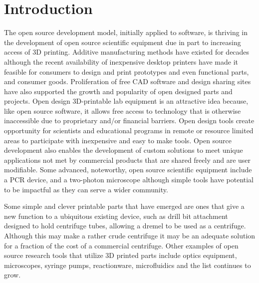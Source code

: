 \documentclass{nature}
\begin{document}
\section*{Introduction}
The open source development model, initially applied to software, is thriving in the development of open source scientific equipment due in part to increasing access of 3D printing\cite{Baden2015,Pearce2013}.
Additive manufacturing methods have existed for decades although the recent availability of inexpensive desktop printers\cite{MakerbotIndustries,RepRap} have made it feasible for consumers to design and print prototypes and even functional parts, and consumer goods\cite{Fullerton2014,Wittbrodt2013}.
Proliferation of free CAD software\cite{OpenScad,Blender,SketchUp,123D} and design sharing sites\cite{Thingiverse,NationalInstitutesofHealth,GrabCAD,GitHubInc} have also supported the growth and popularity of open designed parts and projects.
Open design 3D-printable lab equipment is an attractive idea because, like open source software, it allows free access to technology that is otherwise inaccessible due to proprietary and/or financial barriers. 
Open design tools create opportunity for scientists and educational programs in remote or resource limited areas to participate with inexpensive and easy to make tools\cite{Marzullo2012,Lang2011,Fobel2013,Baker2014,Cybulski2014}.
Open source development also enables the development of custom solutions to meet unique applications not met by commercial products that are shared freely and are user modifiable\cite{Fullerton2014,Pearce2012,Rankin2014,Sulkin2013,Dryden2015,DaCosta2014,Tek2008}.
Some advanced, noteworthy, open source scientific equipment include a PCR device\cite{ChaiBiotechnologiesInc2015}, and a two-photon microscope\cite{Rosenegger2014} although simple tools have potential to be impactful as they can serve a wider community.

Some simple and clever printable parts that have emerged are ones that give a new function to a ubiquitous existing device, such as drill bit attachment designed to hold centrifuge tubes, allowing a dremel to be used as a centrifuge\cite{Garvey2009}.
Although this may make a rather crude centrifuge it may be an adequate solution for a fraction of the cost of a commercial centrifuge.
Other examples of open source research tools that utilize 3D printed parts include optics equipment\cite{Zhang2013}, microscopes\cite{Baden2014a,Walus2014}, syringe pumps\cite{Wijnen2014}, reactionware\cite{Symes2012,Kitson2012,Mathieson2013,Kitson2014}, microfluidics\cite{Brennan2015,Dragone2013} and the list continues to grow\cite{PlosCollections}.
\end{document}
